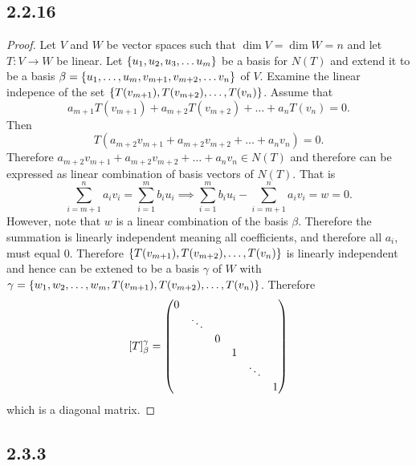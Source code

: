 \documentclass[12pt,titlepage]{extarticle}
\begin{document}
\subsection*{2.2.16}
\begin{proof}
    Let $V$ and $W$ be vector spaces such that $\dim V = \dim W = n$ and let $T : V \to W$ be linear. Let $\qty{u_1, u_2, u_3, \ldots u_m}$ be a basis for $N(T)$ and extend it to be a basis $\beta = \qty{u_1, \ldots, u_m, v_{m+1}, v_{m+2}, \ldots v_n}$ of $V$. Examine the linear indepence of the set $\qty{T(v_{m+1}), T(v_{m+2}), \ldots, T(v_n)}$. Assume that
    \[
        a_{m+1} T(v_{m+1}) + a_{m+2} T(v_{m+2}) + \ldots + a_n T(v_n) = 0.
    \]
    Then
    \[
        T(a_{m+2} v_{m+1} + a_{m+2} v_{m+2} + \ldots + a_n v_n) = 0.
    \]
    Therefore $a_{m+2} v_{m+1} + a_{m+2} v_{m+2} + \ldots + a_n v_n \in N(T)$ and therefore can be expressed as linear combination of basis vectors of $N(T)$. That is
    \[
        \sum_{i=m+1}^{n} a_i v_i = \sum_{i=1}^{m} b_i u_i \implies \sum_{i=1}^{m} b_i u_i - \sum_{i=m+1}^{n} a_i v_i = w = 0.
    \]
    However, note that $w$ is a linear combination of the basis $\beta$. Therefore the summation is linearly independent meaning all coefficients, and therefore all $a_i$, must equal $0$. Therefore $\qty{T(v_{m+1}), T(v_{m+2}), \ldots, T(v_n)}$ is linearly independent and hence can be extened to be a basis $\gamma$ of $W$ with $\gamma = \qty{w_1, w_2, \ldots, w_m, T(v_{m+1}), T(v_{m+2}), \ldots, T(v_n)}$. Therefore
    \[
        [T]_{\beta}^\gamma =
        \mqty(
         0 & & & & &\\
         & \ddots & & & &\\
         & &0 & & & \\
         & & & 1 & & \\
         & & & & \ddots & \\
         & & & & & 1
         )
    \]
    which is a diagonal matrix.
\end{proof}

\subsection*{2.3.3}
\end{document}
